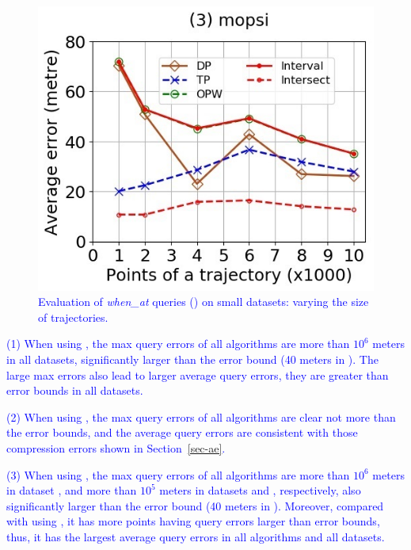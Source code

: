 \begin{figure}[tb!]
	\includegraphics[scale=0.400]{Figures/Exp-when-DAD-error-size-mopsi.jpg}	
	\vspace{-2ex}
	\caption{\small \textcolor{blue}{Evaluation of \emph{when\_at} queries (\dad) on small datasets: varying the size of trajectories.}}
	\label{fig:query-when-dad-size}
	\vspace{-1ex}
\end{figure}



\ni \textcolor{blue}{(1) When using \ped, the max query errors of all algorithms are more than $10^6$ meters in all datasets, significantly larger than the error bound (40 meters in ). The large max errors also lead to larger average query errors, \ie they are greater than error bounds in all datasets.}


\ni \textcolor{blue}{(2) When using \sed, the max query errors of all algorithms are clear not more than the error bounds, and the average query errors are consistent with those compression errors shown in Section~\ref{sec-ae}.}


\ni \textcolor{blue}{(3) When using \dad, the max query errors of all algorithms are more than $10^6$ meters in dataset \ucar, and more than $10^5$ meters in datasets \geolife and \mopsi, respectively, also significantly larger than the error bound (40 meters in ). Moreover, compared with using \ped, it has more points having query errors larger than error bounds, thus, it has the largest average query errors in all algorithms and all datasets.}

